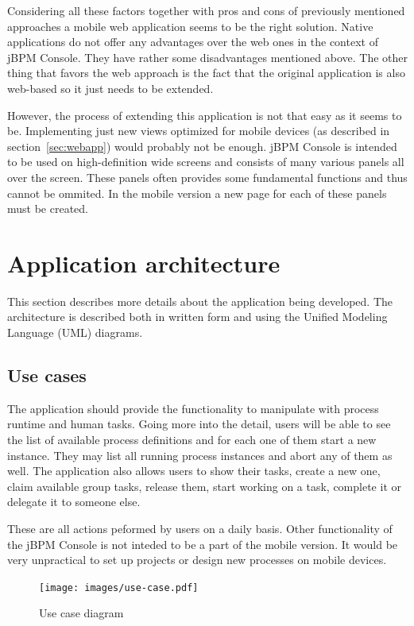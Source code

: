 \documentclass[12pt,oneside,final]{fithesis2}
\begin{document}
Considering all these factors together with pros and cons of previously mentioned approaches a mobile web application seems to be the right solution.
Native applications do not offer any advantages over the web ones in the context of jBPM Console.
They have rather some disadvantages mentioned above.
The other thing that favors the web approach is the fact that the original application is also web-based so it just needs to be extended.

However, the process of extending this application is not that easy as it seems to be.
Implementing just new views optimized for mobile devices (as described in section~\ref{sec:webapp}) would probably not be enough.
jBPM Console is intended to be used on high-definition wide screens and consists of many various panels all over the screen.
These panels often provides some fundamental functions and thus cannot be ommited.
In the mobile version a new page for each of these panels must be created.

\section{Application architecture}
This section describes more details about the application being developed.
The architecture is described both in written form and using the Unified Modeling Language (UML) diagrams.

\subsection{Use cases}
The application should provide the functionality to manipulate with process runtime and human tasks.
Going more into the detail, users will be able to see the list of available process definitions and for each one of them start a new instance.
They may list all running process instances and abort any of them as well.
The application also allows users to show their tasks, create a new one, claim available group tasks, release them, start working on a task, complete it or delegate it to someone else.

These are all actions peformed by users on a daily basis.
Other functionality of the jBPM Console is not inteded to be a part of the mobile version.
It would be very unpractical to set up projects or design new processes on mobile devices.

\begin{figure}[ht!]
\centering
\texttt{[image: images/use-case.pdf]}
\caption{Use case diagram}
\label{fig:use-case}
\end{figure}
\end{document}
